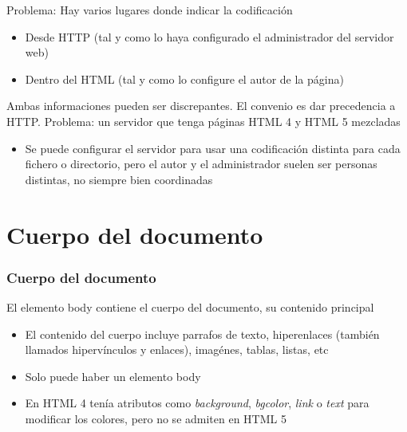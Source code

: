 \documentclass[ucs]{beamer}
\begin{document}
\begin{frame}[fragile]

Problema:
Hay varios lugares donde indicar la codificación


\begin{itemize}
\item
Desde HTTP
(tal y como lo haya configurado el administrador del servidor web)

\item
Dentro del HTML
(tal y como lo configure el autor de la página)
\end{itemize}

Ambas informaciones pueden ser discrepantes.
El convenio es dar precedencia a HTTP.
Problema: un servidor que tenga páginas HTML 4 y HTML 5 mezcladas


    \begin{itemize}
    \item
Se puede configurar el servidor para usar una codificación distinta para
cada fichero o directorio, pero el autor y el administrador suelen
ser personas distintas, no siempre bien coordinadas
    \end{itemize}



\end{frame}



\section{Cuerpo del documento}


\begin{frame}[fragile]
\frametitle{Cuerpo del documento}
El elemento body contiene el cuerpo del documento, su contenido principal


\begin{itemize}
\item
El contenido del cuerpo incluye
parrafos de texto, hiperenlaces (también llamados hipervínculos y enlaces), imagénes, tablas, listas, etc

\item
Solo puede haber un elemento body

\item
En HTML 4 tenía atributos como 
\emph{background},
\emph{bgcolor},
\emph{link}
o
\emph{text} para modificar los colores, pero no se admiten en HTML 5
\end{itemize}

\end{frame}
\end{document}
